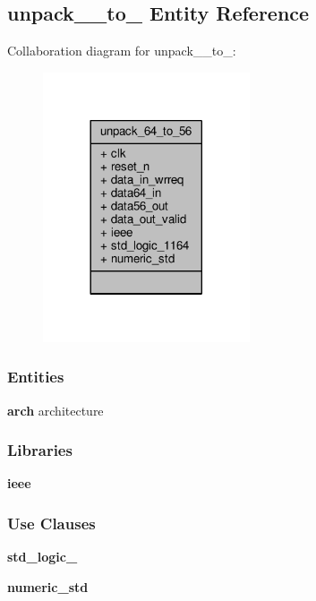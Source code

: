\subsection{unpack\+\_\+\_\+to\+\_ Entity Reference}
\label{classunpack__64__to__56}


Collaboration diagram for unpack\+\_\+\_\+to\+\_\+:\nopagebreak
\begin{figure}[H]
\begin{center}
\leavevmode
\includegraphics[width=173pt]{d9/dc1/classunpack__64__to__56__coll__graph}
\end{center}
\end{figure}
\subsubsection*{Entities}
\begin{DoxyCompactItemize}
\item 
{\bf arch} architecture
\end{DoxyCompactItemize}
\subsubsection*{Libraries}
 \begin{DoxyCompactItemize}
\item 
{\bf ieee} 
\end{DoxyCompactItemize}
\subsubsection*{Use Clauses}
 \begin{DoxyCompactItemize}
\item 
{\bf std\+\_\+logic\+\_}   
\item 
{\bf numeric\+\_\+std}   
\end{DoxyCompactItemize}
